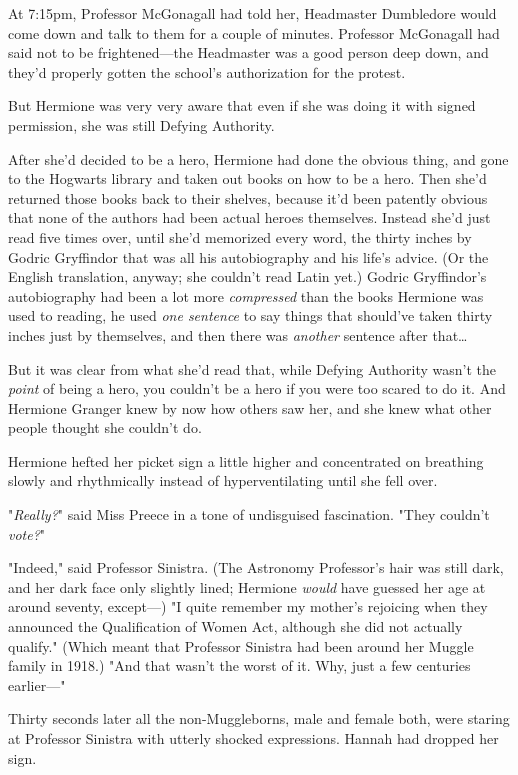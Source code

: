 At 7:15pm, Professor McGonagall had told her, Headmaster Dumbledore would come 
down and talk to them for a couple of minutes. Professor McGonagall had said 
not to be frightened---the Headmaster was a good person deep down, and they'd 
properly gotten the school's authorization for the protest.

But Hermione was very very aware that even if she was doing it with signed 
permission, she was still Defying Authority.

After she'd decided to be a hero, Hermione had done the obvious thing, and gone 
to the Hogwarts library and taken out books on how to be a hero. Then she'd 
returned those books back to their shelves, because it'd been patently obvious 
that none of the authors had been actual heroes themselves. Instead she'd just 
read five times over, until she'd memorized every word, the thirty inches by 
Godric Gryffindor that was all his autobiography and his life's advice. (Or the 
English translation, anyway; she couldn't read Latin yet.) Godric Gryffindor's 
autobiography had been a lot more \emph{compressed} than the books Hermione was 
used to reading, he used \emph{one sentence} to say things that should've taken 
thirty inches just by themselves, and then there was \emph{another} sentence 
after that{\ldots}

But it was clear from what she'd read that, while Defying Authority wasn't the 
\emph{point} of being a hero, you couldn't be a hero if you were too scared to 
do it. And Hermione Granger knew by now how others saw her, and she knew what 
other people thought she couldn't do.

Hermione hefted her picket sign a little higher and concentrated on breathing 
slowly and rhythmically instead of hyperventilating until she fell over.

"\emph{Really?}" said Miss Preece in a tone of undisguised fascination. "They 
couldn't \emph{vote?}"

"Indeed," said Professor Sinistra. (The Astronomy Professor's hair was still 
dark, and her dark face only slightly lined; Hermione \emph{would} have guessed 
her age at around seventy, except---) "I quite remember my mother's rejoicing 
when they announced the Qualification of Women Act, although she did not 
actually qualify." (Which meant that Professor Sinistra had been around her 
Muggle family in 1918.) "And that wasn't the worst of it. Why, just a few 
centuries earlier---"

Thirty seconds later all the non-Muggleborns, male and female both, were 
staring at Professor Sinistra with utterly shocked expressions. Hannah had 
dropped her sign.

